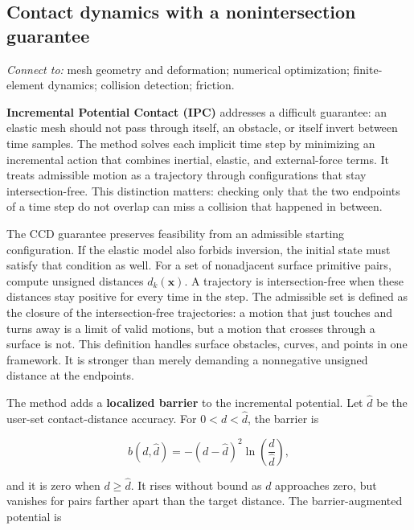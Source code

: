 \subsection{Contact dynamics with a nonintersection guarantee}\label{04-visual-computing-ii-ch029-contact-dynamics-with-a-nonintersection-guarantee}

\hypertarget{04-visual-computing-ii-ch029-contact-dynamics-with-a-nonintersection-guarantee}{}

\emph{Connect to:} mesh geometry and deformation; numerical optimization; finite-element dynamics; collision detection; friction.

\textbf{Incremental Potential Contact (IPC)} addresses a difficult guarantee: an elastic mesh should not pass through itself, an obstacle, or itself invert between time samples. The method solves each implicit time step by minimizing an incremental action that combines inertial, elastic, and external-force terms. It treats admissible motion as a trajectory through configurations that stay intersection-free. This distinction matters: checking only that the two endpoints of a time step do not overlap can miss a collision that happened in between.

The CCD guarantee preserves feasibility from an admissible starting configuration. If the elastic model also forbids inversion, the initial state must satisfy that condition as well. For a set of nonadjacent surface primitive pairs, compute unsigned distances \(d_k(\mathbf{x})\). A trajectory is intersection-free when these distances stay positive for every time in the step. The admissible set is defined as the closure of the intersection-free trajectories: a motion that just touches and turns away is a limit of valid motions, but a motion that crosses through a surface is not. This definition handles surface obstacles, curves, and points in one framework. It is stronger than merely demanding a nonnegative unsigned distance at the endpoints.

The method adds a \textbf{localized barrier} to the incremental potential. Let \(\widehat d\) be the user-set contact-distance accuracy. For \(0<d<\widehat d\), the barrier is

\[b(d,\widehat d)=-(d-\widehat d)^2\ln\left(\frac{d}{\widehat d}\right),\]

and it is zero when \(d\ge\widehat d\). It rises without bound as \(d\) approaches zero, but vanishes for pairs farther apart than the target distance. The barrier-augmented potential is

